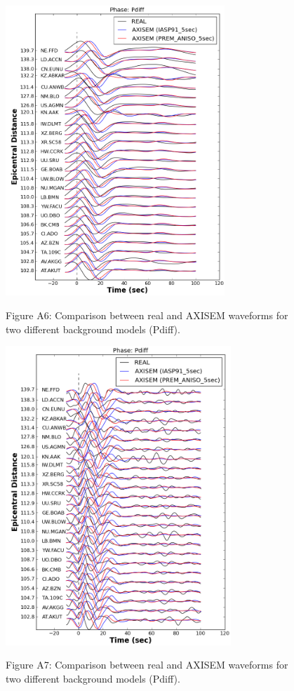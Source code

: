 \documentclass{article}
\begin{document}
\begin{figure}
\centering
\includegraphics[width=234pt, height=310pt, keepaspectratio=true]{AXISEMTutorial-fig012.png}
\begin{center}
{\small{}Figure A6: Comparison between real and AXISEM waveforms for two different 
background models (Pdiff).}
\end{center}
\end{figure}

\begin{figure}
\centering
\includegraphics[width=241pt, height=320pt, keepaspectratio=true]{AXISEMTutorial-fig013.png}
\begin{center}
{\small{}Figure A7: Comparison between real and AXISEM waveforms for two different 
background models (Pdiff).} 
\end{center}
\end{figure}
\end{document}
